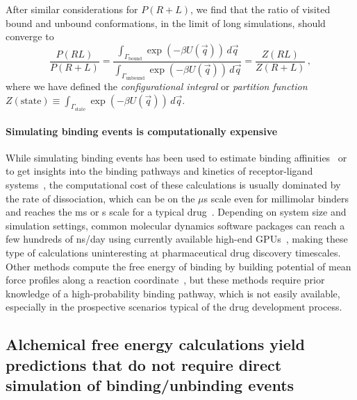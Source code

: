 \documentclass[9pt,bestpractices]{livecoms}
\begin{document}
After similar considerations for $P(R+L)$, we find that the ratio of visited bound and unbound conformations, in the limit of long simulations, should converge to
\begin{equation}\label{eq:bound-unbound-probability-ratio}
    \frac{P(RL)}{P(R+L)} = \frac{\int_{\Gamma_{\mathrm{bound}}} \exp\left( -\beta U(\vec{q}) \right) \, d\vec{q}}{\int_{\Gamma_{\mathrm{unbound}}} \exp\left( -\beta U(\vec{q}) \right) \, d\vec{q}} = \frac{Z(RL)}{Z(R+L)} \, ,
\end{equation}
where we have defined the \textit{configurational integral} or \textit{partition function} $Z(\mathrm{state}) \equiv \int_{\Gamma_{\mathrm{state}}} \exp\left(-\beta U(\vec{q})\right) \, d\vec{q}$.

\paragraph{Simulating binding events is computationally expensive}
While simulating binding events has been used to estimate binding affinities~\cite{jong_determining_2011,pan2017quantitative} or to get insights into the binding pathways and kinetics of receptor-ligand systems~\cite{teo_adaptive_2016,votapka_seekr_2017,doerr_--fly_2014,plattner_protein_2015,dixon_predicting_2018}, the computational cost of these calculations is usually dominated by the rate of dissociation, which can be on the $\mu$s scale even for millimolar binders~\cite{pan2017quantitative} and reaches the ms or s scale for a typical drug~\cite{basavapathruni_conformational_2012,hyre_cooperative_2006}.
Depending on system size and simulation settings, common molecular dynamics software packages can reach a few hundreds of ns/day using currently available high-end GPUs~\cite{eastman_openmm_2017,kutzner_more_2019}, making these type of calculations uninteresting at pharmaceutical drug discovery timescales.
Other methods compute the free energy of binding by building potential of mean force profiles along a reaction coordinate~\cite{woo2005calculationa,velezvega_overcoming_2013,limongelli_funnel_2013,heinzelmann2017attachpullrelease}, but these methods require prior knowledge of a high-probability binding pathway, which is not easily available, especially in the prospective scenarios typical of the drug development process.

\subsection{Alchemical free energy calculations yield predictions that do not require direct simulation of binding/unbinding events}
\end{document}
